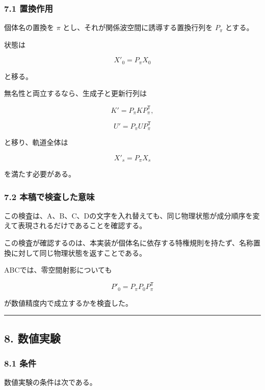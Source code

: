\documentclass[
  10pt,
  a4paper,
]{article}
\begin{document}
\subsubsection{7.1 置換作用}\label{ux7f6eux63dbux4f5cux7528}

個体名の置換を \(\pi\) とし、それが関係波空間に誘導する置換行列を
\(P_\pi\) とする。

状態は

\[
X'_0=P_\pi X_0
\]

と移る。

無名性と両立するなら、生成子と更新行列は

\[
K'=P_\pi K P_\pi^{\mathsf T},
\]

\[
U'=P_\pi U P_\pi^{\mathsf T}
\]

と移り、軌道全体は

\[
X'_s=P_\pi X_s
\]

を満たす必要がある。

\subsubsection{7.2
本稿で検査した意味}\label{ux672cux7a3fux3067ux691cux67fbux3057ux305fux610fux5473}

この検査は、A、B、C、Dの文字を入れ替えても、同じ物理状態が成分順序を変えて表現されるだけであることを確認する。

この検査が確認するのは、本実装が個体名に依存する特権規則を持たず、名称置換に対して同じ物理状態を返すことである。

ABCでは、零空間射影についても

\[
P'_0
=
P_\pi P_0P_\pi^{\mathsf T}
\]

が数値精度内で成立するかを検査した。

\begin{center}\rule{0.5\linewidth}{0.5pt}\end{center}

\subsection{8. 数値実験}\label{ux6570ux5024ux5b9fux9a13}

\subsubsection{8.1 条件}\label{ux6761ux4ef6}

数値実験の条件は次である。
\end{document}

